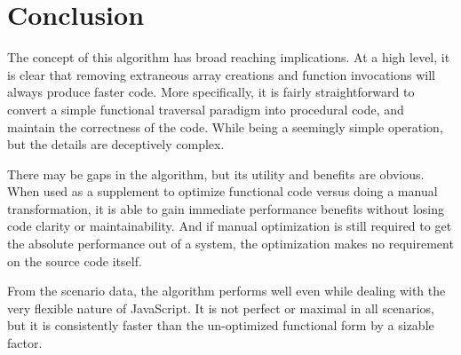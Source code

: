 \chapter{Conclusion}

The concept of this algorithm has broad reaching implications.  At a high level, it is clear that removing extraneous array creations and function invocations will always produce faster code.  More specifically, it is fairly straightforward to convert a simple functional traversal paradigm into procedural code, and maintain the correctness of the code. While being a seemingly simple operation, but the details are deceptively complex.

There may be gaps in the algorithm, but its utility and benefits are obvious.  When used as a supplement to optimize functional code versus doing a manual transformation, it is able to gain immediate performance benefits without losing code clarity or maintainability.  And if manual optimization is still required to get the absolute performance out of a system, the optimization makes no requirement on the source code itself.    

From the scenario data, the algorithm performs well even while dealing with the very flexible nature of JavaScript. It is not perfect or maximal in all scenarios, but it is consistently faster than the un-optimized functional form by a sizable factor.
